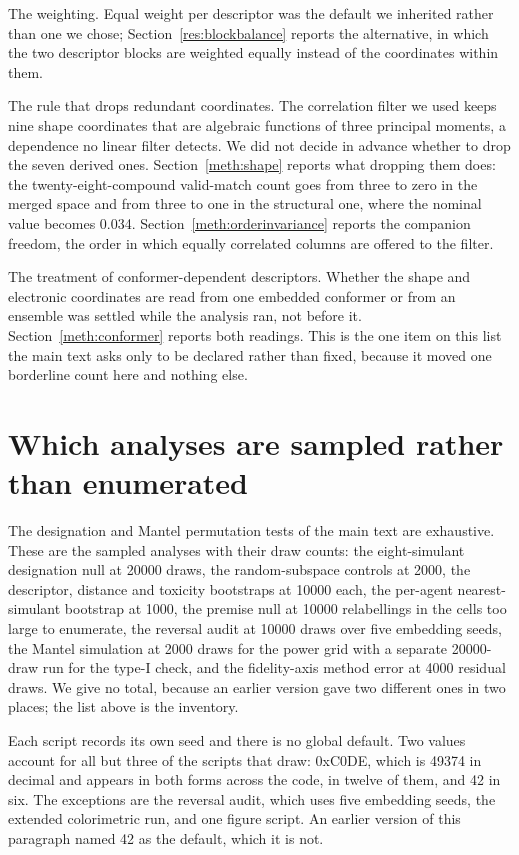 \documentclass[11pt,a4paper]{article}
\begin{document}
The weighting. Equal weight per descriptor was the default we inherited rather
than one we chose; Section~\ref{res:blockbalance} reports the alternative, in
which the two descriptor blocks are weighted equally instead of the coordinates
within them.

The rule that drops redundant coordinates. The correlation filter we used keeps
nine shape coordinates that are algebraic functions of three principal moments,
a dependence no linear filter detects. We did not decide in advance whether to
drop the seven derived ones. Section~\ref{meth:shape} reports what dropping
them does: the twenty-eight-compound valid-match count goes from three to zero
in the merged space and from three to one in the structural one, where the
nominal value becomes 0.034. Section~\ref{meth:orderinvariance} reports the
companion freedom, the order in which equally correlated columns are offered to
the filter.

The treatment of conformer-dependent descriptors. Whether the shape and
electronic coordinates are read from one embedded conformer or from an ensemble
was settled while the analysis ran, not before it.
Section~\ref{meth:conformer} reports both readings. This is the one item on
this list the main text asks only to be declared rather than fixed, because it
moved one borderline count here and nothing else.

\section{Which analyses are sampled rather than enumerated}
\label{meth:sampling}

The designation and Mantel permutation tests of the main text are exhaustive.
These are the sampled analyses with their draw counts: the eight-simulant
designation null at 20000 draws, the random-subspace controls at 2000, the
descriptor, distance and toxicity bootstraps at 10000 each, the per-agent
nearest-simulant bootstrap at 1000, the premise null at 10000 relabellings in
the cells too large to enumerate, the reversal audit at 10000 draws over five
embedding seeds, the Mantel simulation at 2000 draws for the power grid with
a separate 20000-draw run for the type-I check, and the fidelity-axis method
error at 4000 residual draws. We give no total, because an earlier version gave
two different ones in two places; the list above is the inventory.

Each script records its own seed and there is no global default. Two values
account for all but three of the scripts that draw: 0xC0DE, which is 49374 in
decimal and appears in both forms across the code, in twelve of them, and 42 in
six. The exceptions are the reversal audit, which uses five embedding seeds, the
extended colorimetric run, and one figure script. An earlier version of this
paragraph named 42 as the default, which it is not.
\end{document}
